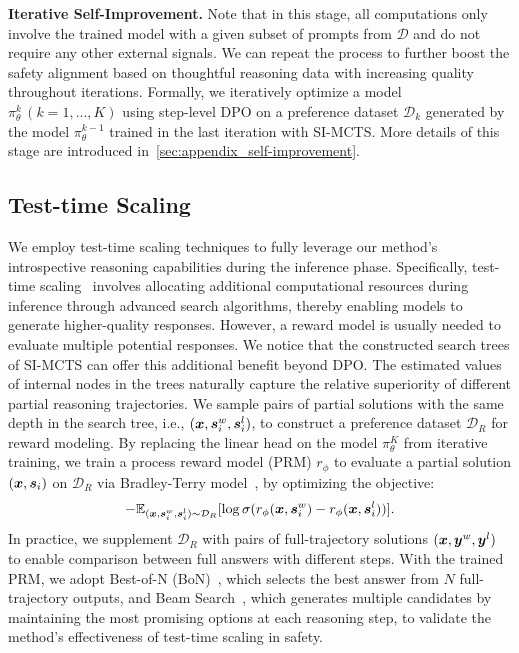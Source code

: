 \textbf{Iterative Self-Improvement.} Note that in this stage, all computations only involve the trained model with a given subset of prompts from $\mathcal{D}$ and do not require any other external signals. We can repeat the process to further boost the safety alignment based on thoughtful reasoning data with increasing quality throughout iterations. Formally, we iteratively optimize a model $\pi_\theta^k\,(k=1,...,K)$ using step-level DPO on a preference dataset $\mathcal{D}_k$ generated by the model $\pi_\theta^{k-1}$ trained in the last iteration with SI-MCTS. More details of this stage are introduced in~\cref{sec:appendix_self-improvement}.



\subsection{Test-time Scaling}
\label{sec:TTS}


We employ test-time scaling techniques to fully leverage our method's introspective reasoning capabilities during the inference phase. Specifically, test-time scaling~\cite{snell2024scaling,jaech2024openai} involves allocating additional computational resources during inference through advanced search algorithms, thereby enabling models to generate higher-quality responses.
However, a reward model is usually needed to evaluate multiple potential responses. We notice that the constructed search trees of SI-MCTS can offer this additional benefit beyond DPO. The estimated values of internal nodes in the trees naturally capture the relative superiority of different partial reasoning trajectories. We sample pairs of partial solutions with the same depth in the search tree, i.e., $(\boldsymbol{x}, \boldsymbol{s}_i^w, \boldsymbol{s}_i^l)$, to construct a preference dataset $\mathcal{D}_R$ for reward modeling. By replacing the linear head on the model $\pi_\theta^K$ from iterative training, we train a process reward model (PRM) $r_\phi$ to evaluate a partial solution $(\boldsymbol{x},\boldsymbol{s}_i)$ on $\mathcal{D}_R$ via Bradley-Terry model~\cite{ouyang2022training}, by optimizing the objective:
\begin{equation}
   -\mathbb{E}_{(\boldsymbol{x},\boldsymbol{s}_i^w,\boldsymbol{s}_i^l)\sim\mathcal{D}_R} [\log\sigma(r_\phi(\boldsymbol{x},\boldsymbol{s}_i^w)-r_\phi(\boldsymbol{x},\boldsymbol{s}_i^l))].
\end{equation}
In practice, we supplement $\mathcal{D}_R$ with pairs of full-trajectory solutions $(\boldsymbol{x}, \boldsymbol{y}^w,\boldsymbol{y}^l)$ to enable comparison between full answers with different steps. With the trained PRM, we adopt Best-of-N (BoN)~\cite{lightmanlet}, which selects the best answer from $N$ full-trajectory outputs, and Beam Search~\cite{xie2024self}, which generates multiple candidates by maintaining the most promising options at each reasoning step, to validate the method's effectiveness of test-time scaling in safety. 




